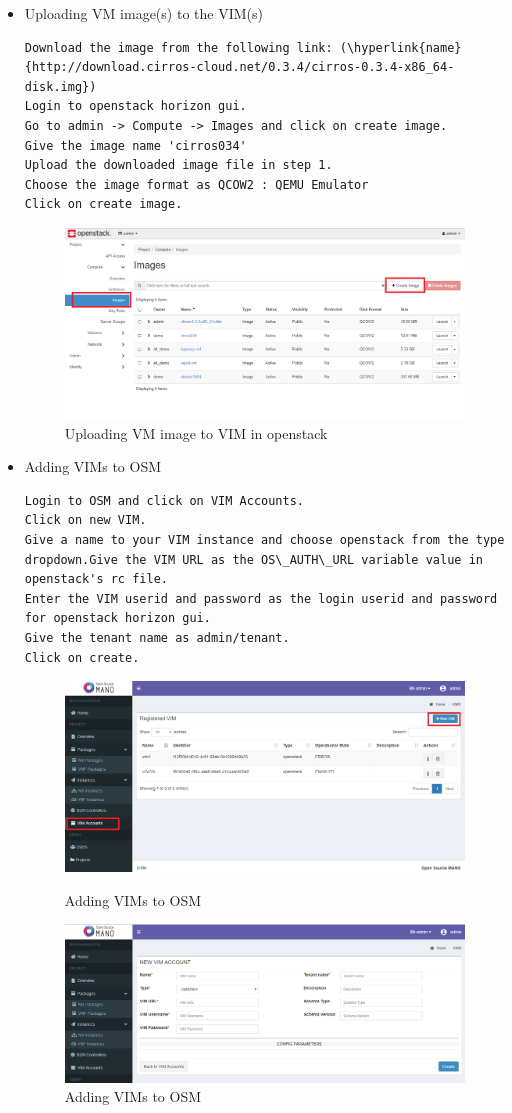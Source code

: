 \begin{itemize}
\item Uploading VM image(s) to the VIM(s)
\begin{lstlisting}
Download the image from the following link: (\hyperlink{name}{http://download.cirros-cloud.net/0.3.4/cirros-0.3.4-x86_64-disk.img})
Login to openstack horizon gui.
Go to admin -> Compute -> Images and click on create image.
Give the image name 'cirros034'
Upload the downloaded image file in step 1.
Choose the image format as QCOW2 : QEMU Emulator
Click on create image.
\end{lstlisting}
\begin{figure} [h]
	\centering
	\includegraphics[width=0.5\linewidth]{figures/sh8}
	\caption{Uploading VM image to VIM in openstack}
\end{figure}
\item Adding VIMs to OSM
\begin{lstlisting}
Login to OSM and click on VIM Accounts.
Click on new VIM.
Give a name to your VIM instance and choose openstack from the type dropdown.Give the VIM URL as the OS\_AUTH\_URL variable value in openstack's rc file.
Enter the VIM userid and password as the login userid and password for openstack horizon gui.
Give the tenant name as admin/tenant.
Click on create.
\end{lstlisting}
\begin{figure} [h]
	\centering
	\includegraphics[width=0.5\linewidth]{figures/sh6}
	\caption{Adding VIMs to OSM}
	\includegraphics[width=0.5\linewidth]{figures/sh7}
	\caption{Adding VIMs to OSM}
\end{figure}
\end{itemize}
\newpage
